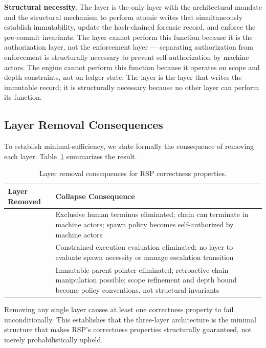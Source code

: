 \medskip
\noindent\textbf{Structural necessity.} The \fact{} layer is the only layer with the architectural mandate and the structural mechanism to perform atomic writes that simultaneously establish immutability, update the hash-chained forensic record, and enforce the pre-commit invariants. The \purpose{} layer cannot perform this function because it is the authorization layer, not the enforcement layer --- separating authorization from enforcement is structurally necessary to prevent self-authorization by machine actors. The \bounds{} engine cannot perform this function because it operates on scope and depth constraints, not on ledger state. The \fact{} layer is the layer that writes the immutable record; it is structurally necessary because no other layer can perform its function.

\subsection{Layer Removal Consequences}
\label{sec:rs-layer-removal}

To establish minimal-sufficiency, we state formally the consequence of removing each layer. Table~\ref{tab:layer-removal} summarizes the result.

\begin{table}[ht]
\begin{center}
\begin{tabular}{l|p{6.5cm}}
\toprule
\textbf{Layer Removed} & \textbf{Collapse Consequence} \\
\midrule
\pbox{} & Exclusive human terminus eliminated; chain can terminate in machine actors; spawn policy becomes self-authorized by machine actors \\
\bounds{} & Constrained execution evaluation eliminated; no layer to evaluate spawn necessity or manage escalation transition \\
\fact{} & Immutable parent pointer eliminated; retroactive chain manipulation possible; scope refinement and depth bound become policy conventions, not structural invariants \\
\bottomrule
\end{tabular}
\caption{Layer removal consequences for RSP correctness properties.}
\label{tab:layer-removal}
\end{center}
\end{table}

Removing any single layer causes at least one correctness property to fail unconditionally. This establishes that the three-layer architecture is the minimal structure that makes RSP's correctness properties structurally guaranteed, not merely probabilistically upheld.

